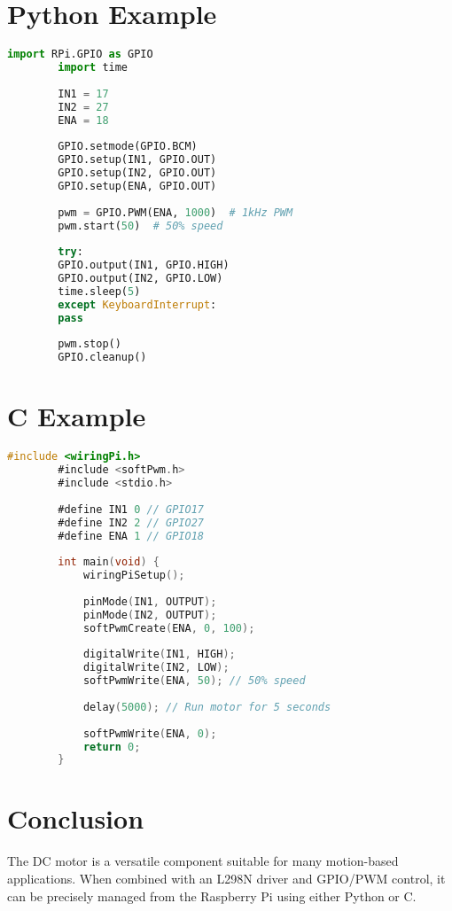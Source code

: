 \documentclass{article}
\begin{document}
	\section{Python Example}
	\begin{lstlisting}[language=Python]
		import RPi.GPIO as GPIO
		import time
		
		IN1 = 17
		IN2 = 27
		ENA = 18
		
		GPIO.setmode(GPIO.BCM)
		GPIO.setup(IN1, GPIO.OUT)
		GPIO.setup(IN2, GPIO.OUT)
		GPIO.setup(ENA, GPIO.OUT)
		
		pwm = GPIO.PWM(ENA, 1000)  # 1kHz PWM
		pwm.start(50)  # 50% speed
		
		try:
		GPIO.output(IN1, GPIO.HIGH)
		GPIO.output(IN2, GPIO.LOW)
		time.sleep(5)
		except KeyboardInterrupt:
		pass
		
		pwm.stop()
		GPIO.cleanup()
	\end{lstlisting}
	
	\section{C Example}
	\begin{lstlisting}[language=C]
		#include <wiringPi.h>
		#include <softPwm.h>
		#include <stdio.h>
		
		#define IN1 0 // GPIO17
		#define IN2 2 // GPIO27
		#define ENA 1 // GPIO18
		
		int main(void) {
			wiringPiSetup();
			
			pinMode(IN1, OUTPUT);
			pinMode(IN2, OUTPUT);
			softPwmCreate(ENA, 0, 100);
			
			digitalWrite(IN1, HIGH);
			digitalWrite(IN2, LOW);
			softPwmWrite(ENA, 50); // 50% speed
			
			delay(5000); // Run motor for 5 seconds
			
			softPwmWrite(ENA, 0);
			return 0;
		}
	\end{lstlisting}
	
	\section{Conclusion}
	The DC motor is a versatile component suitable for many motion-based applications. When combined with an L298N driver and GPIO/PWM control, it can be precisely managed from the Raspberry Pi using either Python or C.
\end{document}
